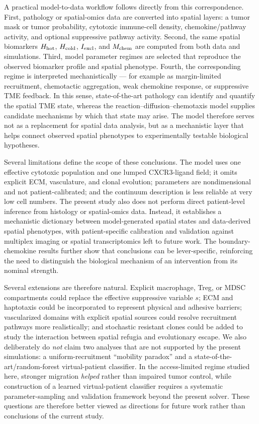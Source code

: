 \documentclass[]{interact}
\theoremstyle{plain}%
\theoremstyle{definition}
\theoremstyle{remark}
\begin{document}
A practical model-to-data workflow follows directly from this correspondence.
First, pathology or spatial-omics data are converted into spatial layers: a
tumor mask or tumor probability, cytotoxic immune-cell density,
chemokine/pathway activity, and optional suppressive pathway activity. Second,
the same spatial biomarkers
$H_{\rm hot}$, $H_{\rm cold}$, $I_{\rm excl}$, and $M_{\rm chem}$ are computed
from both data and simulations. Third, model
parameter regimes are selected that reproduce the observed biomarker profile
and spatial phenotype. Fourth, the corresponding regime is interpreted
mechanistically --- for example as margin-limited recruitment, chemotactic
aggregation, weak chemokine response, or suppressive TME feedback. In this
sense, state-of-the-art pathology can identify and quantify the spatial TME state,
whereas the reaction--diffusion--chemotaxis model supplies candidate mechanisms
by which that state may arise. The model therefore serves not as a replacement
for spatial data analysis, but as a mechanistic layer that helps connect
observed spatial phenotypes to experimentally testable biological hypotheses.

Several limitations define the scope of these conclusions. The model uses one effective cytotoxic population and one lumped CXCR3-ligand field; it omits explicit ECM, vasculature, and clonal evolution; parameters are nondimensional and not patient-calibrated; and the continuum description is less reliable at very low cell numbers. The present study also does not perform direct patient-level inference from histology or spatial-omics data. Instead, it establishes a mechanistic dictionary between model-generated spatial states and data-derived spatial phenotypes, with patient-specific calibration and validation against multiplex imaging or spatial transcriptomics left to future work. The boundary-chemokine results further show that conclusions can be lever-specific, reinforcing the need to distinguish the biological mechanism of an intervention from its nominal strength.

Several extensions are therefore natural. Explicit macrophage, Treg, or MDSC compartments could replace the effective suppressive variable $s$; ECM and haptotaxis could be incorporated to represent physical and adhesive barriers; vascularized domains with explicit spatial sources could resolve recruitment pathways more realistically; and stochastic resistant clones could be added to study the interaction between spatial refugia and evolutionary escape. We also deliberately do \emph{not} claim two analyses that are not supported by the present simulations: a uniform-recruitment ``mobility paradox'' and a state-of-the-art/random-forest virtual-patient classifier. In the access-limited regime
studied here, stronger migration \emph{helped} rather than impaired tumor control, while construction of a learned virtual-patient classifier requires a systematic parameter-sampling and validation framework beyond the present solver. These questions are therefore better viewed as directions for future work rather than conclusions of the current study.
\end{document}
